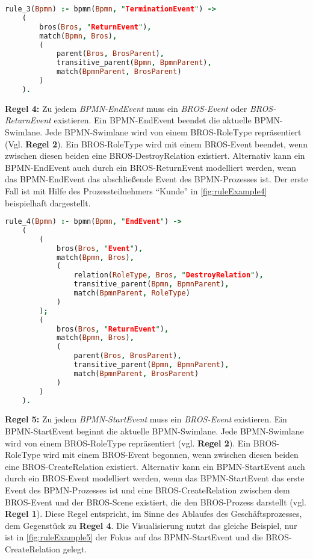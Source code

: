 \begin{lstlisting}[language=Prolog, caption=Formalisierung der Regel 3, label=lst:rule_3]
rule_3(Bpmn) :- bpmn(Bpmn, "TerminationEvent") ->
    (
        bros(Bros, "ReturnEvent"), 
        match(Bpmn, Bros),
        (
            parent(Bros, BrosParent),
            transitive_parent(Bpmn, BpmnParent),
            match(BpmnParent, BrosParent)
        )
    ).
\end{lstlisting}

\textbf{Regel 4:}
Zu jedem \emph{BPMN-EndEvent} muss ein \emph{BROS-Event} oder \emph{BROS-ReturnEvent} existieren.
Ein BPMN-EndEvent beendet die aktuelle BPMN-Swimlane.
Jede BPMN-Swimlane wird von einem BROS-RoleType repräsentiert (Vgl. \textbf{Regel 2}).
Ein BROS-RoleType wird mit einem BROS-Event beendet, wenn zwischen diesen beiden eine BROS-DestroyRelation existiert.
Alternativ kann ein BPMN-EndEvent auch durch ein BROS-ReturnEvent modelliert werden, wenn das BPMN-EndEvent das abschließende Event des BPMN-Prozesses ist.
Der erste Fall ist mit Hilfe des Prozessteilnehmers ``Kunde'' in \cref{fig:ruleExample4} beispielhaft dargestellt.

\pagebreak

\begin{lstlisting}[language=Prolog, caption=Formalisierung der Regel 4, label=lst:rule_4]
rule_4(Bpmn) :- bpmn(Bpmn, "EndEvent") ->
    (
        (
            bros(Bros, "Event"),
            match(Bpmn, Bros),
            (
                relation(RoleType, Bros, "DestroyRelation"),
                transitive_parent(Bpmn, BpmnParent),
                match(BpmnParent, RoleType)
            )
        );
        (
            bros(Bros, "ReturnEvent"), 
            match(Bpmn, Bros),
            (
                parent(Bros, BrosParent),
                transitive_parent(Bpmn, BpmnParent),
                match(BpmnParent, BrosParent)
            )
        )
    ).
\end{lstlisting}

\textbf{Regel 5:}
Zu jedem \emph{BPMN-StartEvent} muss ein \emph{BROS-Event} existieren.
Ein BPMN-StartEvent beginnt die aktuelle BPMN-Swimlane.
Jede BPMN-Swimlane wird von einem BROS-RoleType repräsentiert (vgl. \textbf{Regel 2}).
Ein BROS-RoleType wird mit einem BROS-Event begonnen, wenn  zwischen diesen beiden eine BROS-CreateRelation existiert.
Alternativ kann ein BPMN-StartEvent auch durch ein BROS-Event modelliert werden, wenn das BPMN-StartEvent das erste Event des BPMN-Prozesses ist und eine BROS-CreateRelation zwischen dem BROS-Event und der BROS-Scene existiert, die den BROS-Prozess darstellt (vgl. \textbf{Regel 1}).
Diese Regel entspricht, im Sinne des Ablaufes des Geschäftsprozesses, dem Gegenstück zu \textbf{Regel 4}.
Die Visualisierung nutzt das gleiche Beispiel, nur ist in \cref{fig:ruleExample5} der Fokus auf das BPMN-StartEvent und die BROS-CreateRelation gelegt.

